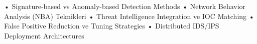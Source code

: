 • Signature-based vs Anomaly-based Detection Methods
• Network Behavior Analysis (NBA) Teknikleri
• Threat Intelligence Integration ve IOC Matching
• False Positive Reduction ve Tuning Strategies
• Distributed IDS/IPS Deployment Architectures